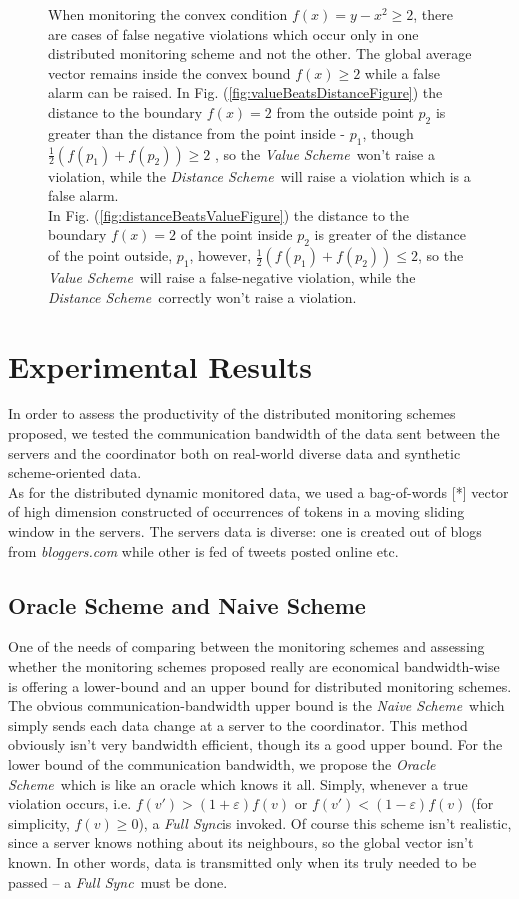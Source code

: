 \documentclass[10pt, conference]{IEEEtran}
\newcommand{\valueScheme}{\textit{Value Scheme}}
\newcommand{\distanceScheme}{\textit{Distance Scheme}}
\newcommand{\fullSync}{\textit{Full Sync}}
\newcommand{\naiveScheme}{\textit{Naive Scheme}}
\newcommand{\oracleScheme}{\textit{Oracle Scheme}}
\begin{document}
\begin{figure}[t]
\small
When monitoring the convex condition ${f(x) = y - x^2  \geq 2}$, there are cases of false negative violations which occur only in one distributed monitoring scheme and not the other. The global average vector remains inside the convex bound ${f(x) \geq 2}$ while a false alarm can be raised. In Fig. (\ref{fig:valueBeatsDistanceFigure}) the distance to the boundary $f(x) = 2$ from the outside point $p_2$ is greater than the distance from the point inside - $p_1$, though ${\frac{1}{2}(f(p_1)+f(p_2))\geq 2}$ , so the \valueScheme \ won't raise a violation, while the \distanceScheme \ will raise a violation which is a false alarm. \\
In Fig. (\ref{fig:distanceBeatsValueFigure}) the distance to the boundary $f(x) = 2$ of the point inside $p_2$ is greater of the distance of the point outside, $p_1$, however, ${\frac{1}{2}(f(p_1)+f(p_2))\leq 2}$, so the \valueScheme \ will raise a false-negative violation, while the \distanceScheme \ correctly won't raise a violation.
\end{figure}

\section{Experimental Results}
In order to assess the productivity of the distributed monitoring schemes proposed, we tested the communication bandwidth of the data sent between the servers and the coordinator both on real-world diverse data and synthetic scheme-oriented data. \\
As for the distributed dynamic monitored data, we used a bag-of-words [*] vector of high dimension constructed of occurrences of tokens in a moving sliding window in the servers. The servers data is diverse: one is created out of blogs from \textit{bloggers.com} while other is fed of tweets posted online etc. 
\subsection{Oracle Scheme and Naive Scheme}
One of the needs of comparing between the monitoring schemes and assessing whether the monitoring schemes proposed really are economical bandwidth-wise is offering a lower-bound and an upper bound for distributed monitoring schemes. \\
The obvious communication-bandwidth upper bound is the \naiveScheme \ which simply sends each data change at a server to the coordinator. This method obviously isn't very bandwidth efficient, though its a good upper bound.
For the lower bound of the communication bandwidth, we propose the \oracleScheme \ which is like an oracle which knows it all. Simply, whenever a true violation occurs, i.e. ${f(v') > (1
+\varepsilon)f(v)}$ or ${f(v') < (1-\varepsilon)f(v)}$ (for simplicity, ${f(v) \geq 0}$), a \fullSync is invoked. Of course this scheme isn't realistic, since a server knows nothing about its neighbours, so the global vector isn't known. In other words, data is transmitted only when its truly needed to be passed -- a \fullSync \ must be done.
\end{document}
